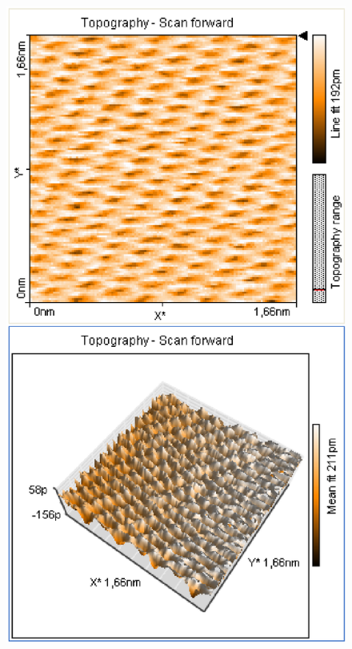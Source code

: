 \documentclass[12pt]{article}
\begin{document}
\begin{figure}[H]  
\begin{minipage}{0.4\linewidth}
\centering
\includegraphics[width=0.9\linewidth]{../plot/data/graphit/graphit3.eps}
\end{minipage}
\begin{minipage}{0.2\linewidth}
\centering
\end{minipage}
\begin{minipage}{0.4\linewidth}
\centering

\end{minipage}
\end{figure}
\end{document}
